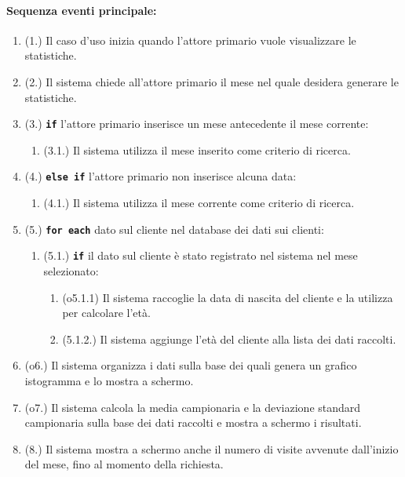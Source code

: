 \documentclass{article}
\begin{document}
	\paragraph{Sequenza eventi principale:}
	\begin{enumerate}[itemsep=8pt,parsep=0pt]
	    \item (1.) Il caso d'uso inizia quando l'attore primario vuole visualizzare le statistiche. 
		\item (2.) Il sistema chiede all'attore primario il mese nel quale desidera generare le statistiche.
		\item (3.) \texttt{\textbf{if}} l'attore primario inserisce un mese antecedente il mese corrente:
			\begin{enumerate}	[leftmargin=28pt]
				\item (3.1.) Il sistema utilizza il mese inserito come criterio di ricerca.
  			\end{enumerate}	
		\item (4.) \texttt{\textbf{else if}} l'attore primario non inserisce alcuna data:
			\begin{enumerate}	[leftmargin=28pt]
				\item (4.1.) Il sistema utilizza il mese corrente come criterio di ricerca.
  			\end{enumerate}

		\item (5.) \texttt{\textbf{for each}} dato sul cliente nel database dei dati sui clienti:
		    \begin{enumerate}	[leftmargin=28pt]
				\item (5.1.) \texttt{\textbf{if}} il dato sul cliente è stato registrato nel sistema nel mese selezionato:
					\begin{enumerate}	[leftmargin=28pt]
						\item (o5.1.1) Il sistema raccoglie la data di nascita del cliente e la utilizza per calcolare l'età.
						\item (5.1.2.) Il sistema aggiunge l'età del cliente alla lista dei dati raccolti.
		  			\end{enumerate}	
  		    \end{enumerate}

	    \item (o6.) Il sistema organizza i dati sulla base dei quali genera un grafico istogramma e lo mostra a schermo.
	    \item (o7.) Il sistema calcola la media campionaria e la deviazione standard campionaria sulla base dei dati raccolti e mostra a schermo i risultati.
	    \item (8.) Il sistema mostra a schermo anche il numero di visite avvenute dall'inizio del mese, fino al momento della richiesta. %
	\end{enumerate}
	
\end{document}
